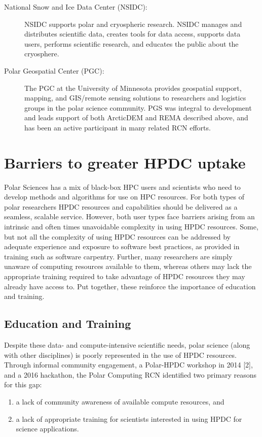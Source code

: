 \documentclass[10pt,letterpaper,draft]{article}
\begin{document}
\begin{description}
\item[National Snow and Ice Data Center (NSIDC):]
 NSIDC supports polar and cryospheric research. NSIDC manages and distributes scientific data, creates tools for data access, supports data users, performs scientific research, and educates the public about the cryosphere.
 
 \item[Polar Geospatial Center (PGC):]
  The PGC at the University of Minnesota provides geospatial support, mapping, and GIS/remote sensing solutions to researchers and logistics groups in the polar science community. PGS was integral to development and leads support of both ArcticDEM and REMA described above, and has been an active participant in many related RCN efforts.

\end{description}

\section*{Barriers to greater HPDC uptake}
Polar Sciences has a mix of black-box HPC users and scientists who need to develop methods and algorithms for use on HPC resources. For both types of polar researchers HPDC resources and capabilities should be delivered as a seamless, scalable service. However, both user types face barriers arising from an intrinsic and often times unavoidable complexity in using HPDC resources. Some, but not all the complexity of using HPDC resources can be addressed by adequate experience and exposure to software best practices, as provided in training such as software carpentry. Further, many researchers are simply unaware of computing resources available to them, whereas others may lack the appropriate training required to take advantage of HPDC resources they may already have access to. Put together, these reinforce the importance of education and training.

\subsection*{Education and Training}
Despite these data- and compute-intensive scientific needs, polar science (along with other disciplines) is poorly represented in the use of HPDC resources. Through informal community engagement, a Polar-HPDC workshop in 2014 [2], and a 2016 hackathon, the Polar Computing RCN identified two primary reasons for this gap:
\begin{enumerate}
\item a lack of community awareness of available compute resources, and
\item a lack of appropriate training for scientists interested in using HPDC for science applications.
\end{enumerate} 
\end{document}
